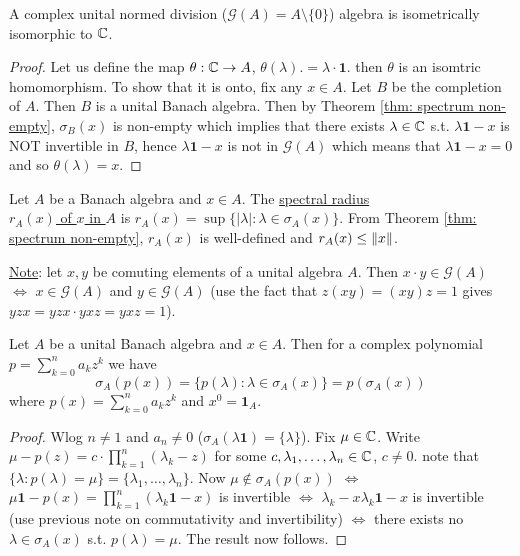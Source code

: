 \documentclass{article}
\begin{document}
\begin{boxcor}\label{cor: Gelfand-mazur}
    A complex unital normed division ($\mathcal{G}(A)=A\setminus\{0\}$) algebra is isometrically isomorphic to $\mathbb{C}$.
\end{boxcor}

\begin{proof}
    Let us define the map $\theta: \mathbb{C} \to A$, $\theta(\lambda). =\lambda\cdot\mathbf{1}$. then $\theta$ is an isomtric homomorphism. To show that it is onto, fix any $x\in A$. Let $B$ be the completion of $A$. Then $B$ is a unital Banach algebra. Then by Theorem \ref{thm: spectrum non-empty}, $\sigma_B(x)$ is non-empty which implies that there exists $\lambda\in \mathbb{C}$ s.t. $\lambda\mathbf{1}-x$ is NOT invertible in $B$, hence $\lambda\mathbf{1}-x$ is not in $\mathcal{G}(A)$ which means that $\lambda\mathbf{1}-x = 0$ and so $\theta(\lambda) = x$.
\end{proof}

\begin{boxdef}\label{def: spectral radius}
Let $A$ be a Banach algebra and $x\in A$. The \noindent\underline{spectral radius}\\ \underline{$r_A(x)$ of $x$ in $A$} is $r_A(x) = \sup\{|\lambda|:\lambda\in\sigma_A(x)\}$. From Theorem \ref{thm: spectrum non-empty}, $r_A(x)$ is well-defined and $r_A(x)\leq \left\lVert x\right\rVert$.
\end{boxdef}

\noindent\underline{Note}: let $x,y$ be comuting elements of a unital algebra $A$. Then $x\cdot y\in \mathcal{G}(A)$ $\iff$ $x\in \mathcal{G}(A)$ and $y\in \mathcal{G}(A)$ (use the fact that $z(xy)=(xy)z=1$ gives $yzx = yzx\cdot yxz = yxz = 1$).

\begin{boxlemma}\label{lemma: spectral mapping for polys}
    Let $A$ be a unital Banach algebra and $x\in A$. Then for a complex polynomial $p = \displaystyle\sum^n_{k=0}a_kz^k$ we have
    $$
    \sigma_A(p(x)) = \{p(\lambda):\lambda\in \sigma_A(x)\}=p(\sigma_A(x))
    $$
    where $p(x) = \displaystyle\sum^n_{k=0}a_kz^k$ and $x^0=\mathbf{1}_A$.
\end{boxlemma}

\begin{proof}
    Wlog $n\neq 1$ and $a_n\neq 0$ ($\sigma_A(\lambda\mathbf{1})=\{\lambda\}$). Fix $\mu\in \mathbb{C}$. Write $\mu-p(z) = c\cdot \displaystyle\prod^n_{k=1}(\lambda_k-z)$ for some $c, \lambda_1, \dots, \lambda_n\in\mathbb{C}$, $c\neq 0$. note that $\{\lambda: p(\lambda)=\mu\} = \{\lambda_1, \dots, \lambda_n\}$. Now $\mu\not\in \sigma_A(p(x))$ $\iff$ $\mu\mathbf{1}-p(x)=\displaystyle\prod^n_{k=1}(\lambda_k\mathbf{1}-x)$ is invertible $\iff$ $\lambda_k-x\lambda_k\mathbf{1}-x$ is invertible (use previous note on commutativity and invertibility) $\iff$ there exists no $\lambda\in \sigma_A(x)$ s.t. $p(\lambda) = \mu$. The result now follows. 
\end{proof}
\end{document}
